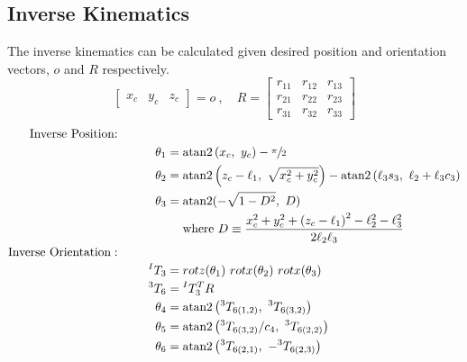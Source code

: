 \subsection{Inverse Kinematics}
The inverse kinematics can be calculated given desired position and orientation vectors, $o$ and $R$ respectively.
\[
\begin{bmatrix}x_c & y_c & z_c \end{bmatrix} = o~,\quad
  R =
  \begin{bmatrix}
    r_{11} & r_{12} & r_{13} \\
    r_{21} & r_{22} & r_{23} \\
    r_{31} & r_{32} & r_{33}
  \end{bmatrix}
\]
\begin{equation}
\begin{aligned}
\text{Inverse Position:}\qquad\qquad&\\
\theta_{1}&= \text{atan2} \left(x_{c},~ y_{c}\right) - \sfrac{\pi}{2}\\
\theta_{2}&= \text{atan2} \left(z_c - \ell_1, ~\sqrt{x_c^2 + y_c^2}\right) - \text{atan2}\left(\ell_3s_3,~\ell_2 + \ell_3c_3\right) \\
\theta_{3}&= \text{atan2} (-\sqrt{1-D^{2}},~ D) \\
& \quad \text { where } D\equiv\frac{x_{c}^{2}+y_{c}^{2}+\left(z_{c}-\ell_{1}\right)^{2}-\ell_{2}^{2}-\ell_{3}^{2}}{2 \ell_{2} \ell_{3}} \\
\text{Inverse Orientation}:\qquad\qquad&\\
^IT_3 &= rotz(\theta_1)~rotx(\theta_2)~rotx(\theta_3) \\
{}^3T_6 &= {}^IT_3^TR \\ %
\theta_4 &= \text{atan2} \left({}^3T_{6(1,2)},~{}^3T_{6(3,2)}\right) \\
\theta_5 &= \text{atan2} \left({{}^3T_{6(3,2)}} / {c_4},~{}^3T_{6(2,2)}\right) \\
\theta_6 &= \text{atan2} \left({}^3T_{6(2,1)},~ -{}^3T_{6(2,3)}\right) \\
\end{aligned}
\nonumber
\end{equation}

